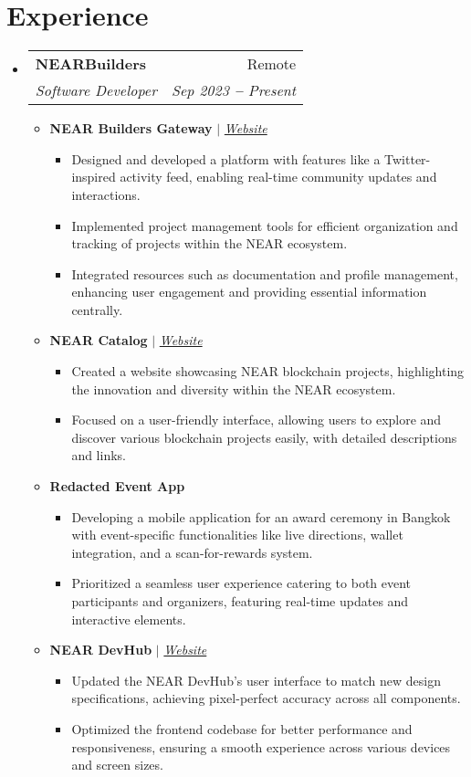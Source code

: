 \documentclass[letterpaper,11pt]{article}
\makeatletter
\newcommand{\resumeItem}[1]{
  \item\small{
    {#1 \vspace{-2pt}}
  }
}
\newcommand{\resumeSubheading}[4]{
  \vspace{-2pt}\item
    \begin{tabular*}{0.97\textwidth}[t]{l@{\extracolsep{\fill}}r}
      \textbf{#1} & #2 \\
      \textit{\small#3} & \textit{\small #4} \\
    \end{tabular*}\vspace{-7pt}
}
\newcommand{\resumeSubHeadingListStart}{\begin{itemize}[leftmargin=0.15in, label={}]}
\newcommand{\resumeSubHeadingListEnd}{\end{itemize}}
\newcommand{\resumeItemListStart}{\begin{itemize}}
\newcommand{\resumeItemListEnd}{\end{itemize}\vspace{-5pt}}
\makeatother
\begin{document}

\section{Experience}
\vspace{3pt}
\resumeSubHeadingListStart

\resumeSubheading
{NEARBuilders}{Remote}
{Software Developer}{Sep 2023 \textbf{--} Present}
\resumeItemListStart
\resumeItem{\textbf{NEAR Builders Gateway} $|$ \emph{\href{https://nearbuilders.org}{\color{blue}Website}}
  \resumeItemListStart
  \resumeItem{
    Designed and developed a platform with features like a Twitter-inspired activity feed, enabling real-time community updates and interactions.}
  \resumeItem{
    Implemented project management tools for efficient organization and tracking of projects within the NEAR ecosystem.}
  \resumeItem{Integrated resources such as documentation and profile management, enhancing user engagement and providing essential information centrally.}
  \resumeItemListEnd
}
\resumeItem{
  \vspace{9pt}
  \textbf{NEAR Catalog} $|$ \emph{\href{https://nearcatalog.xyz}{\color{blue}Website}}
  \resumeItemListStart
  \resumeItem{
    Created a website showcasing NEAR blockchain projects, highlighting the innovation and diversity within the NEAR ecosystem.}
  \resumeItem{
    Focused on a user-friendly interface, allowing users to explore and discover various blockchain projects easily, with detailed descriptions and links.}
  \resumeItemListEnd
}
\resumeItem{
  \vspace{9pt}
  \textbf{Redacted Event App}
  \resumeItemListStart
  \resumeItem{
    Developing a mobile application for an award ceremony in Bangkok with event-specific functionalities like live directions, wallet integration, and a scan-for-rewards system.}
  \resumeItem{
    Prioritized a seamless user experience catering to both event participants and organizers, featuring real-time updates and interactive elements.}
  \resumeItemListEnd
}
\resumeItem{
  \vspace{9pt}
  \textbf{NEAR DevHub} $|$ \emph{\href{https://devhub.near.page}{\color{blue}Website}}
  \resumeItemListStart
  \resumeItem{
    Updated the NEAR DevHub's user interface to match new design specifications, achieving pixel-perfect accuracy across all components.}
  \resumeItem{
    Optimized the frontend codebase for better performance and responsiveness, ensuring a smooth experience across various devices and screen sizes.}
  \resumeItemListEnd
}
\resumeItemListEnd
\resumeSubHeadingListEnd
\end{document}
